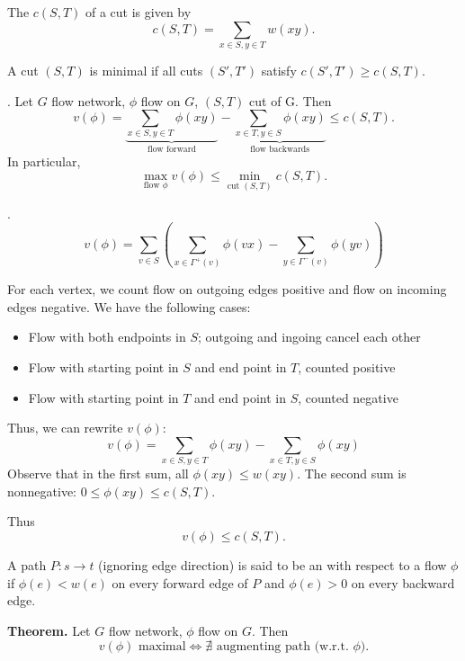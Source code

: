 \begin{definition}
The  $c(S,T)$ of a cut is given by
\[ c(S,T) = \sum_{x\in S, y\in T} w(xy). \]
\end{definition}

A cut $(S,T)$ is minimal if all cuts $(S',T')$ satisfy $c(S', T') \geq c(S,T)$.

\Lemma. Let $G$ flow network, $\phi$ flow on $G$, $(S,T)$ cut of G. Then
\[
v(\phi) = \underbrace{\sum_{x\in S, y\in T} \phi(xy)}_{\text{flow forward}}
        - \underbrace{\sum_{x\in T, y\in S} \phi(xy)}_{\text{flow backwards}}
\leq c(S,T).
\]
In particular,
\[
  \max_{\text{flow $\phi$}} v(\phi)\leq \min_{\text{cut $(S,T)$}} c(S,T).
\]

\Proof.
\[
    v(\phi) = \sum_{v\in S} \left(
        \sum_{x\in \Gamma^+(v)} \phi(vx)
      - \sum_{y\in \Gamma^-(v)} \phi(yv)
    \right)
\]

For each vertex, we count flow on outgoing edges positive and flow on
incoming edges negative. We have the following cases:
\begin{itemize}
  \item Flow with both endpoints in $S$; outgoing and ingoing cancel each other
  \item Flow with starting point in $S$ and end point in $T$, counted positive
  \item Flow with starting point in $T$ and end point in $S$, counted negative
\end{itemize}



Thus, we can rewrite $v(\phi)$:
\[
    v(\phi) = \sum_{x\in S, y\in T} \phi(xy)
            - \sum_{x\in T, y\in S} \phi(xy)
\]
Observe that in the first sum, all $\phi (xy) \leq w(xy)$. The second sum is
nonnegative: $0 \leq \phi (xy) \leq c(S,T)$.

Thus
\[
    v(\phi) \leq c(S,T).
\]

\begin{definition}
A path $P: s\rightarrow t$ (ignoring edge direction) is said to be an  with respect to a flow $\phi$ if $\phi(e) < w(e)$ on every forward edge
of $P$ and $\phi(e) > 0$ on every backward edge.
\end{definition}

\textbf{Theorem.}
Let $G$ flow network, $\phi$ flow on $G$. Then 
\[v(\phi)\text{ maximal} \iff \nexists\text{ augmenting path (w.r.t. $\phi$)}.\]

